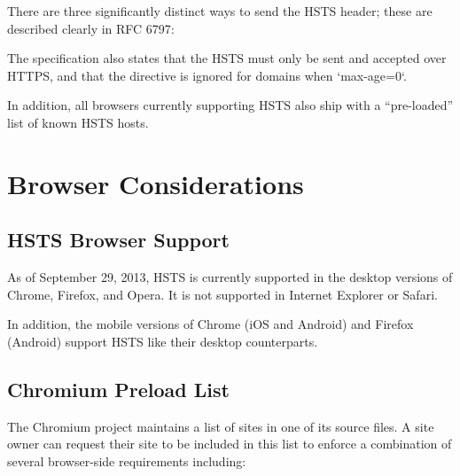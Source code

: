 \documentclass{acm_proc_article-sp}
\begin{document}
There are three significantly distinct ways to send the HSTS header; these are described clearly in RFC 6797\cite{rfc}:

{}

The specification also states that the HSTS must only be sent and accepted over HTTPS, and that the {\iSD} directive is ignored for domains when `max-age=0`.

In addition, all browsers currently supporting HSTS also ship with a ``pre-loaded'' list of known HSTS hosts.

\section{Browser Considerations}

\subsection{HSTS Browser Support}

As of September 29, 2013, HSTS is currently supported in the desktop versions of Chrome, Firefox, and Opera. It is not supported in Internet Explorer or Safari.\cite{support}

In addition, the mobile versions of Chrome (iOS and Android) and Firefox (Android) support HSTS like their desktop counterparts\cite{mdn}.

\subsection{Chromium Preload List}

The Chromium project maintains a list of sites in one of its source files\cite{sts-list}. A site owner can request their site to be included in this list to enforce a combination of several browser-side requirements including:
\end{document}
